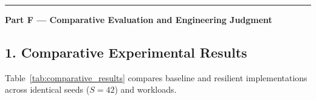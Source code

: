 \documentclass[11pt]{article}
\begin{document}
\vspace{1.5em}\hrule\vspace{1.2em}

\newpage
{\centering\fontsize{14}{17}\selectfont\textbf{Part F --- Comparative Evaluation and Engineering Judgment}\par}
\vspace{0.6em}

\subsection*{1. Comparative Experimental Results}
Table~\ref{tab:comparative_results} compares baseline and resilient implementations across identical seeds ($S=42$) and workloads.
\end{document}

